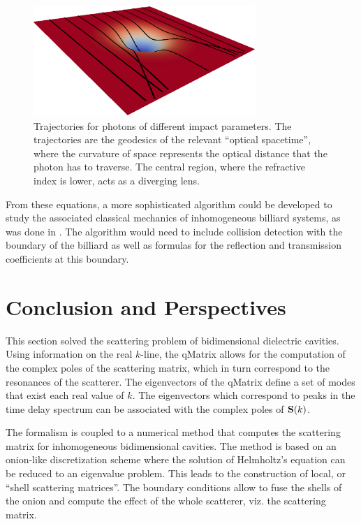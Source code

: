 \begin{figure}
 \centering
 \includegraphics[width=0.75\textwidth]{figs/passive/geodesics-1.eps}
 \caption[Photon trajectories in a Gaussian deformation of the refractive index]
	  {Trajectories for photons of different impact parameters. The trajectories are
	  the geodesics of the relevant ``optical spacetime'', where the curvature of 
	  space represents the optical distance that the photon has to traverse. The central
	  region, where the refractive index is lower, acts as a diverging lens.}
 \label{fig:passive.gaussian.geodesics}
\end{figure}

From these equations, a more sophisticated algorithm could be developed to study
the associated classical mechanics of inhomogeneous billiard systems, as was done
in \cite{SAI2005}. The algorithm would need to include collision detection with the 
boundary of the billiard as well as formulas for the reflection and transmission coefficients
at this boundary.

\section{Conclusion and Perspectives}
This section solved the scattering problem of bidimensional
dielectric cavities. Using information on the real $k$-line,
the \gls{qMatrix} allows for the computation of the complex poles
of the scattering matrix, which in turn correspond to the resonances
of the scatterer. The eigenvectors of the \gls{qMatrix} define 
a set of modes that exist each real value of $k$. The eigenvectors
which correspond to peaks in the time delay spectrum can be associated
with the complex poles of $\mathbf{S}(k)$.

The formalism is coupled to a numerical method that computes 
the scattering matrix for inhomogeneous bidimensional cavities.
The method is based on an onion-like discretization scheme
where the solution of Helmholtz's equation can be reduced to an 
eigenvalue problem. This leads to the construction of local, or 
``shell scattering matrices''. The boundary conditions allow to fuse
the shells of the onion and compute the effect of the whole scatterer, 
viz. the scattering matrix.

